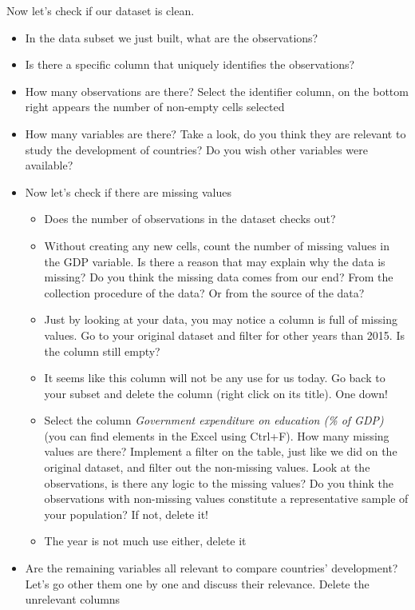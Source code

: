 \documentclass{article}
\begin{document}
    Now let's check if our dataset is clean.
    \begin{itemize}
        \item In the data subset we just built, what are the observations?
        \item Is there a specific column that uniquely identifies the observations?
        \item How many observations are there? Select the identifier column, on the bottom right appears the number of non-empty cells selected
        \item How many variables are there? Take a look, do you think they are relevant to study the development of countries? Do you wish other variables were available?
        \item Now let's check if there are missing values
        \begin{itemize}
            \item Does the number of observations in the dataset checks out?
            \item Without creating any new cells, count the number of missing values in the GDP variable. Is there a reason that may explain why the data is missing? Do you think the missing data comes from our end? From the collection procedure of the data? Or from the source of the data? 
            \item Just by looking at your data, you may notice a column is full of missing values. Go to your original dataset and filter for other years than 2015. Is the column still empty?
            \item It seems like this column will not be any use for us today. Go back to your subset and delete the column (right click on its title). One down!
            \item Select the column \textit{Government expenditure on education (\% of GDP)} (you can find elements in the Excel using Ctrl+F). How many missing values are there? Implement a filter on the table, just like we did on the original dataset, and filter out the non-missing values. Look at the observations, is there any logic to the missing values? Do you think the observations with non-missing values constitute a representative sample of your population? If not, delete it!
            \item The year is not much use either, delete it
        \end{itemize}
        \item Are the remaining variables all relevant to compare countries' development? Let's go other them one by one and discuss their relevance. Delete the unrelevant columns
    \end{itemize}
\end{document}
